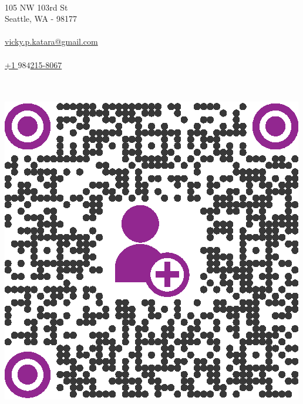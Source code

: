 \documentclass[a4paper,12pt,final]{memoir}
\newcommand{\Sep}{\vspace{1.5em}}
\newcommand{\SmallSep}{\vspace{0.5em}}
\begin{document}

\begin{flushright} 
	\footnotesize
	\SmallSep
	{\bfseries{\color{Plum}{Address}}}\\
	
	105 NW 103rd St\\
	Seattle, WA - 98177\\
	\Sep
	{\bfseries{\color{Plum}{EMail}}}\\
	\href{mailto:vicky.p.katara@gmail.com}{vicky.p.katara@gmail.com}\\
	\Sep
	{\bfseries{\color{Plum}{Cellphone}}}\\
	\href{tel:+19842158067}{+1 \(984\)215-8067}\\
	\Sep
\end{flushright}\normalsize
	\hspace{0.9cm}
		\vspace{-0.35cm}
	\bfseries{\color{Plum}{Save My Contact}}\\\\
	\vspace{-0.1cm}
	\hspace{-0.4cm}
	\includegraphics[width=0.8\columnwidth]{qrcode_2.eps}
\framebreak
\end{document}
